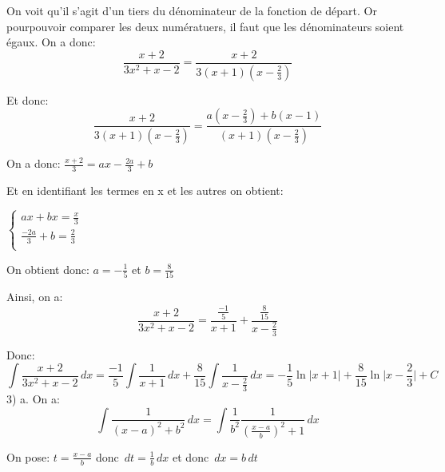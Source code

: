 \documentclass[12pt,a4paper, french]{article}
\begin{document}
On voit qu'il s'agit d'un tiers du dénominateur de la fonction de départ. Or pourpouvoir comparer les deux numératuers, il faut que les dénominateurs soient égaux.  On a donc:
\begin{equation*}
    \frac{x+2}{3x^2+x-2}=\frac{x+2}{3(x+1)(x-\frac{2}{3})}
\end{equation*}


Et donc: 
\begin{equation*}
    \frac{x+2}{3(x+1)(x-\frac{2}{3})}=\frac{a(x-\frac{2}{3})+b(x-1)}{(x+1)(x-\frac{2}{3})}
\end{equation*}

On a donc: \begin{math}
    \frac{x+2}{3}=ax-\frac{2a}{3}+b
\end{math}
  
Et en identifiant les termes en x et les autres on obtient: 
\newline
\begin{center}
$\left\{
    \begin{array}{ll}
        ax+bx=\frac{x}{3}\\
        \frac{-2a}{3}+b=\frac{2}{3}\\ 
    \end{array}
\right.$
\end{center}

On obtient donc: \begin{math}
a=-\frac{1}{5}
\end{math} et \begin{math}
    b=\frac{8}{15}
\end{math}

Ainsi, on a: 
\begin{equation*}
    \frac{x+2}{3x^2+x-2}=\frac{\frac{-1}{5}}{x+1}+\frac{\frac{8}{15}}{x-\frac{2}{3}}
\end{equation*}

Donc: 
\begin{equation*}
\int \frac{x+2}{3x^2+x-2} \,dx = \frac{-1}{5}\int \frac{1}{x+1}\,dx+\frac{8}{15} \int \frac{1}{x-\frac{2}{3}} \,dx=-\frac{1}{5}\ln\left\lvert x+1 \right\rvert +\frac{8}{15}\ln\lvert x-\frac{2}{3}\rvert +C
\end{equation*}
3) a. On a: 
\begin{equation*}
    \int \frac{1}{(x-a)^2+b^2} \,dx=\int \frac{1}{b^2}\frac{1}{(\frac{x-a}{b})^2+1} \,dx
\end{equation*}
 
On pose: \begin{math}
t=\frac{x-a}{b}    
\end{math} donc \begin{math}
    \,dt=\frac{1}{b}\,dx
\end{math} et donc \begin{math}
    \,dx=b\,dt
\end{math}
\end{document}
